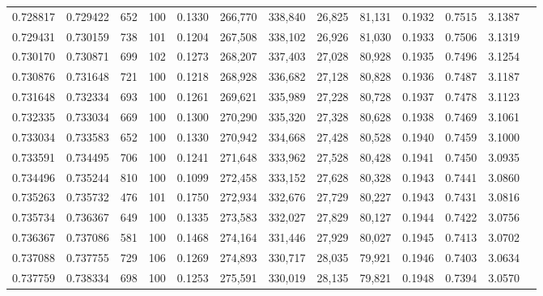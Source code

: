 \begin{tabular}{rrrrrrrrrrrrr}
0.728817 & 0.729422 &   652 & 100 &                                     0.1330 & 266,770 & 338,840 &  26,825 &  81,131 & 0.1932 & 0.7515 & 3.1387 \\
0.729431 & 0.730159 &   738 & 101 &                                     0.1204 & 267,508 & 338,102 &  26,926 &  81,030 & 0.1933 & 0.7506 & 3.1319 \\
0.730170 & 0.730871 &   699 & 102 &                                     0.1273 & 268,207 & 337,403 &  27,028 &  80,928 & 0.1935 & 0.7496 & 3.1254 \\
0.730876 & 0.731648 &   721 & 100 &                                     0.1218 & 268,928 & 336,682 &  27,128 &  80,828 & 0.1936 & 0.7487 & 3.1187 \\
0.731648 & 0.732334 &   693 & 100 &                                     0.1261 & 269,621 & 335,989 &  27,228 &  80,728 & 0.1937 & 0.7478 & 3.1123 \\
0.732335 & 0.733034 &   669 & 100 &                                     0.1300 & 270,290 & 335,320 &  27,328 &  80,628 & 0.1938 & 0.7469 & 3.1061 \\
0.733034 & 0.733583 &   652 & 100 &                                     0.1330 & 270,942 & 334,668 &  27,428 &  80,528 & 0.1940 & 0.7459 & 3.1000 \\
0.733591 & 0.734495 &   706 & 100 &                                     0.1241 & 271,648 & 333,962 &  27,528 &  80,428 & 0.1941 & 0.7450 & 3.0935 \\
0.734496 & 0.735244 &   810 & 100 &                                     0.1099 & 272,458 & 333,152 &  27,628 &  80,328 & 0.1943 & 0.7441 & 3.0860 \\
0.735263 & 0.735732 &   476 & 101 &                                     0.1750 & 272,934 & 332,676 &  27,729 &  80,227 & 0.1943 & 0.7431 & 3.0816 \\
0.735734 & 0.736367 &   649 & 100 &                                     0.1335 & 273,583 & 332,027 &  27,829 &  80,127 & 0.1944 & 0.7422 & 3.0756 \\
0.736367 & 0.737086 &   581 & 100 &                                     0.1468 & 274,164 & 331,446 &  27,929 &  80,027 & 0.1945 & 0.7413 & 3.0702 \\
0.737088 & 0.737755 &   729 & 106 &                                     0.1269 & 274,893 & 330,717 &  28,035 &  79,921 & 0.1946 & 0.7403 & 3.0634 \\
0.737759 & 0.738334 &   698 & 100 &                                     0.1253 & 275,591 & 330,019 &  28,135 &  79,821 & 0.1948 & 0.7394 & 3.0570 \\

\end{tabular}
